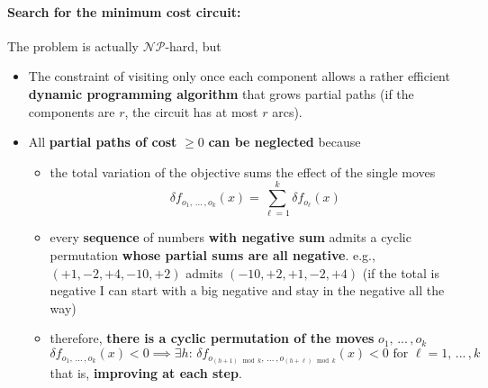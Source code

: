\documentclass[11pt]{article}
\begin{document}
	\paragraph{Search for the minimum cost circuit:} The problem is actually $\mathcal{NP}$-hard, but
	\begin{itemize}
		\item The constraint of visiting only once each component allows a rather efficient \textbf{dynamic programming algorithm} that grows partial paths (if the components are $r$, the circuit has at most $r$ arcs).\\
		
		\item All \textbf{partial paths of cost} $\geq 0$ \textbf{can be neglected} because
		\begin{itemize}
			\item the total variation of the objective sums the effect of the single moves
			$$ \delta f_{o_1, \, ... \, , o_k} (x) = \sum_{\ell = 1}^k \delta f_{o_{\ell}} (x) $$
			
			\item every \textbf{sequence} of numbers \textbf{with negative sum} admits a cyclic permutation \textbf{whose partial sums are all negative}. e.g., $(+1, −2, +4, −10, +2)$ admits $(−10, +2, +1, −2, +4)$ (if the total is negative I can start with a big negative and stay in the negative all the way)
			
			\item therefore, \textbf{there is a cyclic permutation of the moves} $o_1, \, ... \, , o_k$
			$$ \delta f_{o_1, \, ... \, , o_k} (x) < 0 \implies \exists h : \, \delta f_{o_{(h+1) \mod k}, \, ... \, , o_{(h+\ell) \mod k}} (x) < 0 \text{ for } \ell = 1, \, ... \, , k $$
			that is, \textbf{improving at each step}.\\
		\end{itemize}
	\end{itemize}
	
\end{document}
